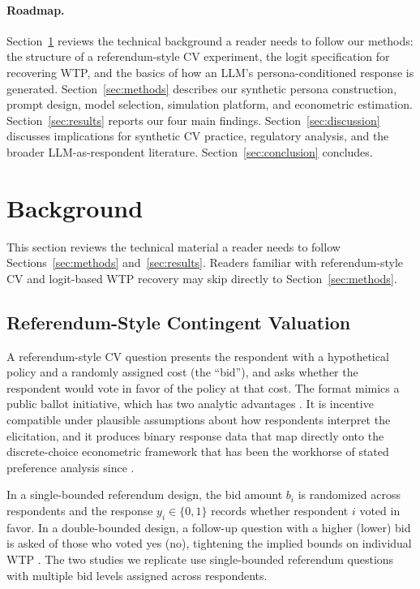 \documentclass[12pt]{article}
\begin{document}
\paragraph{Roadmap.} Section~\ref{sec:background} reviews the technical background a reader needs to follow our methods: the structure of a referendum-style CV experiment, the logit specification for recovering WTP, and the basics of how an LLM's persona-conditioned response is generated. Section~\ref{sec:methods} describes our synthetic persona construction, prompt design, model selection, simulation platform, and econometric estimation. Section~\ref{sec:results} reports our four main findings. Section~\ref{sec:discussion} discusses implications for synthetic CV practice, regulatory analysis, and the broader LLM-as-respondent literature. Section~\ref{sec:conclusion} concludes.

\section{Background}\label{sec:background}

This section reviews the technical material a reader needs to follow Sections~\ref{sec:methods} and~\ref{sec:results}. Readers familiar with referendum-style CV and logit-based WTP recovery may skip directly to Section~\ref{sec:methods}.

\subsection{Referendum-Style Contingent Valuation}\label{sec:bg-cv}

A referendum-style CV question presents the respondent with a hypothetical policy and a randomly assigned cost (the ``bid''), and asks whether the respondent would vote in favor of the policy at that cost. The format mimics a public ballot initiative, which has two analytic advantages \parencite{Carson2007}. It is incentive compatible under plausible assumptions about how respondents interpret the elicitation, and it produces binary response data that map directly onto the discrete-choice econometric framework that has been the workhorse of stated preference analysis since \textcite{Hanemann1984}.

In a single-bounded referendum design, the bid amount $b_i$ is randomized across respondents and the response $y_i \in \{0, 1\}$ records whether respondent $i$ voted in favor. In a double-bounded design, a follow-up question with a higher (lower) bid is asked of those who voted yes (no), tightening the implied bounds on individual WTP \parencite{Hanemann1991}. The two studies we replicate use single-bounded referendum questions with multiple bid levels assigned across respondents.
\end{document}
